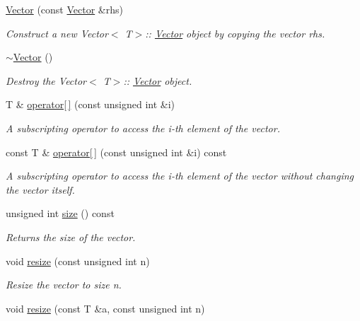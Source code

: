 \begin{DoxyCompactItemize}
\mbox{\hyperlink{classVector_ac71d98c4ac152523a76bbadcd3a83a5a}{Vector}} (const \mbox{\hyperlink{classVector}{Vector}} \&rhs)
\begin{DoxyCompactList}\small\item\em Construct a new Vector$<$ T$>$\+:\+: \mbox{\hyperlink{classVector}{Vector}} object by copying the vector {\ttfamily rhs}. \end{DoxyCompactList}\item 
\mbox{\hyperlink{classVector_afd524fac19e6d3d69db5198ffe2952b0}{$\sim$\+Vector}} ()
\begin{DoxyCompactList}\small\item\em Destroy the Vector$<$ T$>$\+:\+: \mbox{\hyperlink{classVector}{Vector}} object. \end{DoxyCompactList}\item 
T \& \mbox{\hyperlink{classVector_aa07a0c8ca467e2ce190afc26054cf422}{operator\mbox{[}$\,$\mbox{]}}} (const unsigned int \&i)
\begin{DoxyCompactList}\small\item\em A subscripting operator to access the {\ttfamily i}-\/th element of the vector. \end{DoxyCompactList}\item 
const T \& \mbox{\hyperlink{classVector_a36cc881f0270de628bec7a80bbdab741}{operator\mbox{[}$\,$\mbox{]}}} (const unsigned int \&i) const
\begin{DoxyCompactList}\small\item\em A subscripting operator to access the {\ttfamily i}-\/th element of the vector without changing the vector itself. \end{DoxyCompactList}\item 
unsigned int \mbox{\hyperlink{classVector_a5214a382564aedc712b609416aa3b7b1}{size}} () const
\begin{DoxyCompactList}\small\item\em Returns the size of the vector. \end{DoxyCompactList}\item 
void \mbox{\hyperlink{classVector_ae751d4bf4c403e4578a9df1202e93f56}{resize}} (const unsigned int n)
\begin{DoxyCompactList}\small\item\em Resize the vector to size {\ttfamily n}. \end{DoxyCompactList}\item 
void \mbox{\hyperlink{classVector_a1ff5ed0bca47854450eb78024c6f52ff}{resize}} (const T \&a, const unsigned int n)

\end{DoxyCompactItemize}
